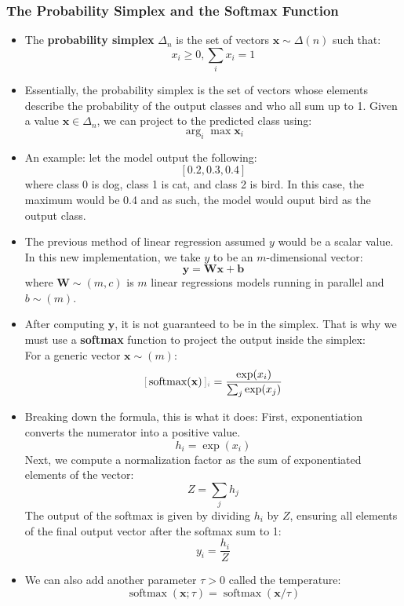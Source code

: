 \documentclass{article}
\newcommand{\tbf}[1]{\textbf{#1}}
\newcommand{\mbf}[1]{\mathbf{#1}}
\begin{document}
    \subsubsection{The Probability Simplex and the Softmax Function}   
    \begin{itemize}
        \item The \tbf{probability simplex} $\Delta _n$ is the set of vectors $\mbf{x} \sim \Delta(n)$ such that:
        \[x_i \geq 0, \sum_i x_i=1\]
        \item Essentially, the probability simplex is the set of vectors whose elements describe the probability of the output classes and who all sum up to 1.
        Given a value $\mbf{x} \in \Delta_n$, we can project to the predicted class using:
        \[\arg_i \max{\mbf{x}_i}\]
        \item An example: let the model output the following:
        \[[0.2,0.3, 0.4]\]
        where class 0 is dog, class 1 is cat, and class 2 is bird. In this case, the maximum would be 0.4 and as such, the model would ouput bird as the output class.
        \item The previous method of linear regression assumed $y$ would be a scalar value. In this new implementation, we take $y$ to be an $m$-dimensional vector:
        \[\mbf{y = Wx+b}\]
        where $\mbf{W} \sim (m,c)$ is $m$ linear regressions models running in parallel and $b \sim (m)$.
        \item After computing $\mbf{y}$, it is not guaranteed to be in the simplex. That is why we must use a \tbf{softmax} function to project the output
        inside the simplex: \\
        For a generic vector $\mbf{x} \sim (m)$:
        \[\textcolor{gray}{[}\operatorname{softmax(\mbf{x})}\textcolor{gray}{]_i} = \frac{\operatorname{exp}(x_i)}{\sum_j \operatorname{exp}(x_j)}\]
        \item Breaking down the formula, this is what it does:
        First, exponentiation converts the numerator into a positive value.
        \[h_i=\operatorname{exp}(x_i)\]
        Next, we compute a normalization factor as the sum of exponentiated elements of the vector:
        \[Z = \sum_j h_j\]
        The output of the softmax is given by dividing $h_i$ by $Z$, ensuring all elements of the final output vector after the softmax sum to 1:
        \[y_i = \frac{h_i}{Z}\]
        \item We can also add another parameter $\tau > 0$ called the temperature:
        \[\operatorname{softmax}(\mbf{x};\tau)=\operatorname{softmax}(\mbf{x}/\tau)\]

\end{itemize}
\end{document}
